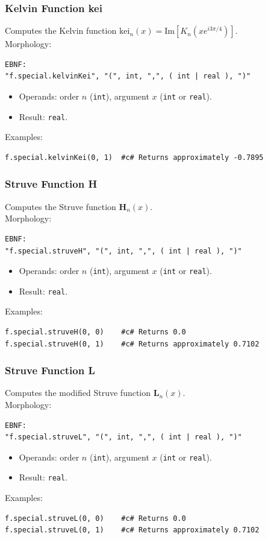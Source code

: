 \subsubsection{Kelvin Function kei}
Computes the Kelvin function $\text{kei}_n(x) = \text{Im}\left[K_n\!\left(x e^{i 3\pi/4}\right)\right]$. \\
Morphology:
\begin{verbatim}
EBNF:
"f.special.kelvinKei", "(", int, ",", ( int | real ), ")"
\end{verbatim}
\begin{itemize}
\item Operands: order $n$ (\texttt{int}), argument $x$ (\texttt{int} or \texttt{real}).
\item Result: \texttt{real}.
\end{itemize}
Examples:
\begin{verbatim}
f.special.kelvinKei(0, 1)  #c# Returns approximately -0.7895
\end{verbatim}

\subsubsection{Struve Function H}
Computes the Struve function $\mathbf{H}_n(x)$. \\
Morphology:
\begin{verbatim}
EBNF:
"f.special.struveH", "(", int, ",", ( int | real ), ")"
\end{verbatim}
\begin{itemize}
\item Operands: order $n$ (\texttt{int}), argument $x$ (\texttt{int} or \texttt{real}).
\item Result: \texttt{real}.
\end{itemize}
Examples:
\begin{verbatim}
f.special.struveH(0, 0)    #c# Returns 0.0
f.special.struveH(0, 1)    #c# Returns approximately 0.7102
\end{verbatim}

\subsubsection{Struve Function L}
Computes the modified Struve function $\mathbf{L}_n(x)$. \\
Morphology:
\begin{verbatim}
EBNF:
"f.special.struveL", "(", int, ",", ( int | real ), ")"
\end{verbatim}
\begin{itemize}
\item Operands: order $n$ (\texttt{int}), argument $x$ (\texttt{int} or \texttt{real}).
\item Result: \texttt{real}.
\end{itemize}
Examples:
\begin{verbatim}
f.special.struveL(0, 0)    #c# Returns 0.0
f.special.struveL(0, 1)    #c# Returns approximately 0.7102
\end{verbatim}

